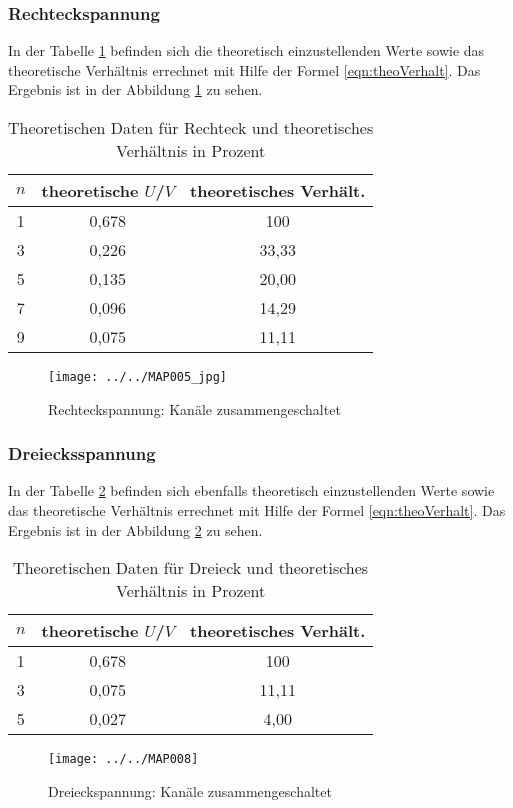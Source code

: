 \subsubsection{Rechteckspannung}
In der Tabelle \ref{tab:RechteckSynthese} befinden sich die theoretisch einzustellenden Werte sowie das theoretische Verhältnis errechnet mit Hilfe der Formel \ref{eqn:theoVerhalt}. Das Ergebnis ist in der Abbildung \ref{fig:map005jpg} zu sehen.
\begin{table}[htbp]
	\centering
	\caption{Theoretischen Daten für Rechteck und theoretisches Verhältnis in Prozent}
	\label{tab:RechteckSynthese}
	\begin{tabular}{c c c}
		\toprule
		$n$ & theoretische $U$/$V$ & theoretisches Verhält. \\
		\midrule
		1 & 0,678 & 100 \\
 		3 & 0,226 & 33,33 \\
		5 & 0,135 & 20,00 \\ 
		7 & 0,096 & 14,29 \\
		9 & 0,075 & 11,11 \\
		\bottomrule
	\end{tabular}
\end{table}
\FloatBarrier
\begin{figure}[htb]
	\centering
	\texttt{[image: ../../MAP005\_jpg]}
	\caption{Rechteckspannung: Kanäle zusammengeschaltet}
	\label{fig:map005jpg}
\end{figure}
\subsubsection{Dreiecksspannung}
In der Tabelle \ref{tab:DreieckSynthese} befinden sich ebenfalls theoretisch einzustellenden Werte sowie das theoretische Verhältnis errechnet mit Hilfe der Formel \ref{eqn:theoVerhalt}. Das Ergebnis ist in der Abbildung \ref{fig:map008} zu sehen.
\begin{table}[htbp]
	\centering
	\caption{Theoretischen Daten für Dreieck und theoretisches Verhältnis in Prozent}
	\label{tab:DreieckSynthese}
	\begin{tabular}{c c c}
		\toprule
		$n$ & theoretische $U$/$V$ & theoretisches Verhält. \\
		\midrule
		1 & 0,678 & 100 \\
		3 & 0,075 & 11,11 \\
		5 & 0,027 & 4,00 \\ 
		\bottomrule
	\end{tabular}
\end{table}
\FloatBarrier
\begin{figure}[htb]
	\centering
	\texttt{[image: ../../MAP008]}
	\caption{Dreieckspannung: Kanäle zusammengeschaltet}
	\label{fig:map008}
\end{figure}
